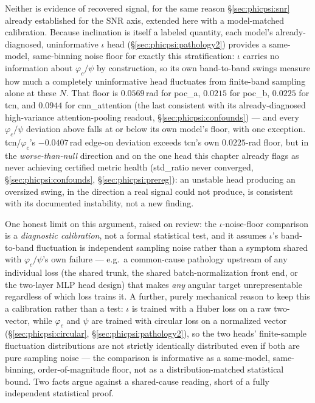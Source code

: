 Neither is evidence of recovered signal, for the same reason \S\ref{sec:phicpsi:snr} already established for the SNR axis, extended here with a model-matched calibration.
Because inclination is itself a labeled quantity, each model's already-diagnosed, uninformative $\iota$ head (\S\ref{sec:phicpsi:pathology2}) provides a same-model, same-binning noise floor for exactly this stratification: $\iota$ carries no information about $\varphi_c/\psi$ by construction, so its own band-to-band swings measure how much a completely uninformative head fluctuates from finite-band sampling alone at these $N$.
That floor is $0.0569$\,rad for poc\_a, $0.0215$ for poc\_b, $0.0225$ for tcn, and $0.0944$ for cnn\_attention (the last consistent with its already-diagnosed high-variance attention-pooling readout, \S\ref{sec:phicpsi:confounds}) --- and every $\varphi_c/\psi$ deviation above falls at or below its own model's floor, with one exception.
tcn/$\varphi_c$'s $-0.0407$\,rad edge-on deviation exceeds tcn's own $0.0225$-rad floor, but in the \emph{worse-than-null} direction and on the one head this chapter already flags as never achieving certified metric health (std\_ratio never converged, \S\ref{sec:phicpsi:confounds}, \S\ref{sec:phicpsi:prereg}): an unstable head producing an oversized swing, in the direction a real signal could not produce, is consistent with its documented instability, not a new finding.

One honest limit on this argument, raised on review: the $\iota$-noise-floor comparison is a \emph{diagnostic calibration}, not a formal statistical test, and it assumes $\iota$'s band-to-band fluctuation is independent sampling noise rather than a symptom shared with $\varphi_c/\psi$'s own failure --- e.g.\ a common-cause pathology upstream of any individual loss (the shared trunk, the shared batch-normalization front end, or the two-layer MLP head design) that makes \emph{any} angular target unrepresentable regardless of which loss trains it.
A further, purely mechanical reason to keep this a calibration rather than a test: $\iota$ is trained with a Huber loss on a raw two-vector, while $\varphi_c$ and $\psi$ are trained with circular loss on a normalized vector (\S\ref{sec:phicpsi:circular}, \S\ref{sec:phicpsi:pathology2}), so the two heads' finite-sample fluctuation distributions are not strictly identically distributed even if both are pure sampling noise --- the comparison is informative as a same-model, same-binning, order-of-magnitude floor, not as a distribution-matched statistical bound.
Two facts argue against a shared-cause reading, short of a fully independent statistical proof.

